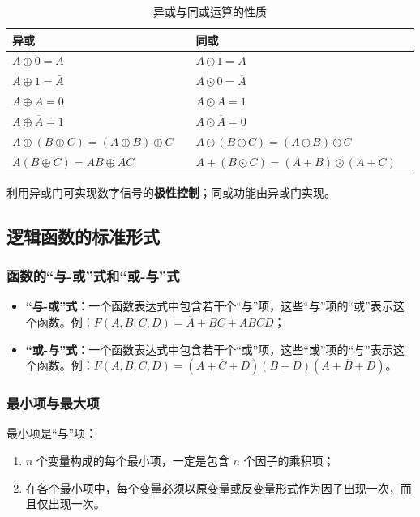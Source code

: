 \begin{table}[H]
\centering
\caption{异或与同或运算的性质}
\label{tab:公式:异或同或性质}
\begin{tabular}{ll|ll}
	\toprule
	异或 & & 同或 & \\
	\midrule
	$A\oplus0=A$ & & $A\odot1=A$ & \\
	$A\oplus1=\overline{A}$ & & $A\odot0=\overline{A}$ & \\
	$A\oplus A=0$ & & $A\odot A=1$ & \\
	$A\oplus\overline{A}=1$ & & $A\odot\overline{A}=0$ & \\
	$A\oplus(B\oplus C)=(A\oplus B)\oplus C$ & & $A\odot(B\odot C)=(A\odot B)\odot C$ & \\
	$A(B\oplus C)=AB\oplus AC$ & & $A+(B\odot C)=(A+B)\odot(A+C)$ & \\
	\bottomrule
\end{tabular}
\end{table}

利用异或门可实现数字信号的\textbf{极性控制}；同或功能由异或门实现。

\subsection{逻辑函数的标准形式}
\label{sec:逻辑函数的标准形式}

\subsubsection{函数的“与-或”式和“或-与”式}

\begin{definition}[与-或式与或-与式]
\label{def:与或式}
\begin{itemize}
	\item \textbf{“与-或”式}：一个函数表达式中包含若干个“与”项，这些“与”项的“或”表示这个函数。例：$F(A,B,C,D)=\overline{A}+BC+ABCD$；
	\item \textbf{“或-与”式}：一个函数表达式中包含若干个“或”项，这些“或”项的“与”表示这个函数。例：$F(A,B,C,D)=(A+\overline{C}+D)(B+D)(A+\overline{B}+D)$。
\end{itemize}
\end{definition}

\subsubsection{最小项与最大项}

\begin{definition}[最小项]
\label{def:最小项}
最小项是“与”项：
\begin{enumerate}
	\item $n$ 个变量构成的每个最小项，一定是包含 $n$ 个因子的乘积项；
	\item 在各个最小项中，每个变量必须以原变量或反变量形式作为因子出现一次，而且仅出现一次。
\end{enumerate}
\end{definition}

